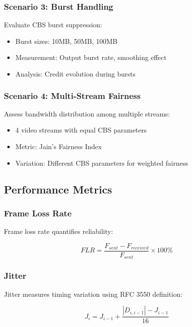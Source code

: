 \documentclass[10pt, journal, compsoc]{IEEEtran}
\begin{document}
\subsubsection{Scenario 3: Burst Handling}

Evaluate CBS burst suppression:
\begin{itemize}
    \item Burst sizes: 10MB, 50MB, 100MB
    \item Measurement: Output burst rate, smoothing effect
    \item Analysis: Credit evolution during bursts
\end{itemize}

\subsubsection{Scenario 4: Multi-Stream Fairness}

Assess bandwidth distribution among multiple streams:
\begin{itemize}
    \item 4 video streams with equal CBS parameters
    \item Metric: Jain's Fairness Index
    \item Variation: Different CBS parameters for weighted fairness
\end{itemize}

\subsection{Performance Metrics}

\subsubsection{Frame Loss Rate}

Frame loss rate quantifies reliability:

\begin{equation}
FLR = \frac{F_{sent} - F_{received}}{F_{sent}} \times 100\%
\end{equation}

\subsubsection{Jitter}

Jitter measures timing variation using RFC 3550 definition:

\begin{equation}
J_i = J_{i-1} + \frac{|D_{i,i-1}| - J_{i-1}}{16}
\end{equation}
\end{document}
